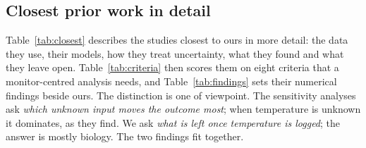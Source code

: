 \subsection{Closest prior work in detail}\label{sec:closest}
Table~\ref{tab:closest} describes the studies closest to ours in more detail: the data they use, their models, how they treat uncertainty, what they found and what they leave open. Table~\ref{tab:criteria} then scores them on eight criteria that a monitor-centred analysis needs, and Table~\ref{tab:findings} sets their numerical findings beside ours. The distinction is one of viewpoint. The sensitivity analyses ask \emph{which unknown input moves the outcome most}; when temperature is unknown it dominates, as they find. We ask \emph{what is left once temperature is logged}; the answer is mostly biology. The two findings fit together.

